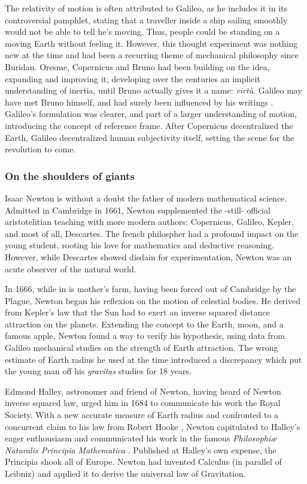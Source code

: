 The relativity of motion is often attributed to Galileo, as he includes it in its controversial pamphlet, stating that a traveller inside a ship sailing smoothly would not be able to tell he's moving. Thus, people could be standing on a moving Earth without feeling it. However, this thought experiment was nothing new at the time and had been a recurring theme of mechanical philosophy since Buridan. Oresme, Copernicus and Bruno had been building on the idea, expanding and improving it, developing over the centuries an implicit understanding of inertia, until Bruno actually gives it a name: \textit{virt\`u}. Galileo may have met Bruno himself, and had surely been influenced by his writings \citep{DeAngelis2015}. Galileo's formulation was clearer, and part of a larger understanding of motion, introducing the concept of reference frame. After Copernicus decentralized the Earth, Galileo decentralized human subjectivity itself, setting the scene for the revolution to come. 

\subsubsection*{On the shoulders of giants}

Isaac Newton is without a doubt the father of modern mathematical science. Admitted in Cambridge in 1661, Newton supplemented the -still- official aristotelitian teaching with more modern authors: Copernicus, Galileo, Kepler, and most of all, Descartes. The french philospher had a profound impact on the young student, rooting his love for mathematics and deductive reasoning. However, while Descartes showed disdain for experimentation, Newton was an acute observer of the natural world. 

In 1666, while in is mother's farm, having been forced out of Cambridge by the Plague, Newton began his reflexion on the motion of celestial bodies. He derived from Kepler's law that the Sun had to exert an inverse squared distance attraction on the planets. Extending the concept to the Earth, moon, and a famous apple, Newton found a way to verify his hypothesis, using data from Galileo mechanical studies on the strength of Earth attraction. The wrong estimate of Earth radius he used at the time introduced a discrepancy which put the young man off his \textit{gravitas} studies for 18 years.

Edmond Halley, astronomer and friend of Newton, having heard of Newton inverse squared law, urged him in 1684 to communicate his work the Royal Society. With a new accurate measure of Earth radius and confronted to a concurrent claim to his law from Robert Hooke \citep{Kramer1982}, Newton capitulated to Halley's eager enthousiasm and communicated his work in the famous \textit{Philosophiæ Naturalis Principia Mathematica} \citep{Newton1687}. Published at Halley's own expense, the Principia shook all of Europe. Newton had invented Calculus (in parallel of Leibniz) and applied it to derive the universal law of Gravitation.

